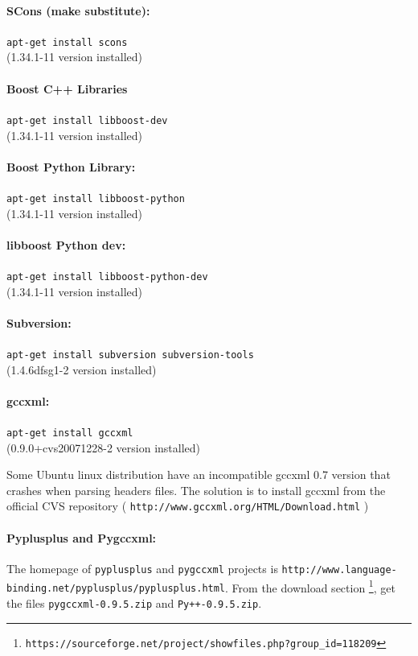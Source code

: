 \documentclass[12pt,a4paper]{article}
\begin{document}
\paragraph{SCons (make substitute):} {\tt apt-get install scons} \\
(1.34.1-11 version installed)


\paragraph{Boost C++ Libraries} {\tt apt-get install libboost-dev} \\
(1.34.1-11 version installed)


\paragraph{Boost Python Library:} {\tt apt-get install libboost-python} \\
(1.34.1-11 version installed)


\paragraph{libboost Python dev:} {\tt apt-get install libboost-python-dev} \\
(1.34.1-11 version installed)

\paragraph{Subversion:} {\tt apt-get install subversion subversion-tools} \\
(1.4.6dfsg1-2 version installed)

\paragraph{gccxml:} {\tt apt-get install gccxml} \\
(0.9.0+cvs20071228-2 version installed)

Some Ubuntu linux distribution have an incompatible gccxml 0.7 version that crashes when parsing headers files. The solution is to install gccxml from the official CVS repository ( {\tt http://www.gccxml.org/HTML/Download.html} )


\paragraph{Pyplusplus and Pygccxml: }
The homepage of {\tt pyplusplus} and {\tt pygccxml} projects is 
{\tt http://www.language-binding.net/pyplusplus/pyplusplus.html}. From the
download section \footnote{\tt https://sourceforge.net/project/showfiles.php?group\_id=118209}, 
get the files {\tt pygccxml-0.9.5.zip} and {\tt Py++-0.9.5.zip}.
\end{document}
